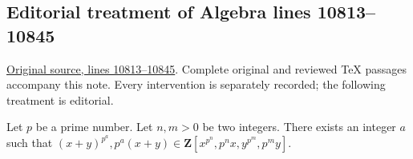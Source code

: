 \subsection{Editorial treatment of Algebra lines 10813--10845}

\hypertarget{algebra-context-129}{}

\noindent\href{https://github.com/stacks/stacks-project/blob/a04446e57ec1fbc252a871afcec7752fb2807b14/algebra.tex\#L10813}{Original source, lines 10813--10845}. Complete original and reviewed TeX passages accompany this note. Every intervention is separately recorded; the following treatment is editorial.


\begin{lemma}
\label{editorial-source-lemma-help-with-powers}
Let $p$ be a prime number. Let $n, m > 0$ be two integers. There exists
an integer $a$ such that
$(x + y)^{p^a}, p^a(x + y) \in \mathbf{Z}[x^{p^n}, p^nx, y^{p^m}, p^my]$.
\end{lemma}


